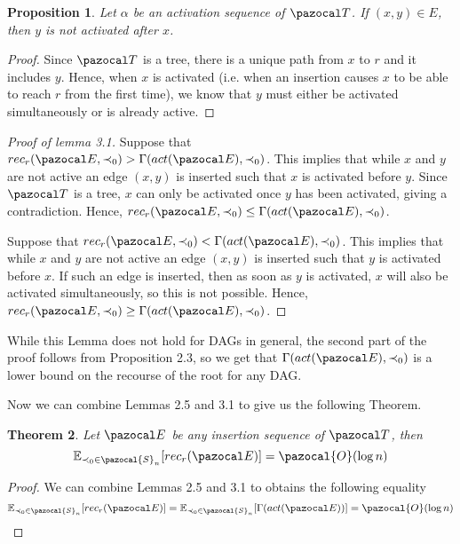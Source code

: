 \documentclass{article}
\newtheorem{theorem}{Theorem}[section]
\newtheorem{proposition}[theorem]{Proposition}
\begin{document}
\begin{proposition}
Let $\alpha$ be an activation sequence of $\pazocal T$. If $(x,y) \in E$, then $y$ is not activated after $x$.
\end{proposition}

\begin{proof}
Since $\pazocal T$ is a tree, there is a unique path from $x$ to $r$ and it includes $y$. Hence, when $x$ is activated (i.e. when an insertion causes $x$ to be able to reach $r$ from the first time), we know that $y$ must either be activated simultaneously or is already active.
\end{proof}

\begin{proof}[Proof of lemma 3.1]
Suppose that $rec_r(\pazocal E, \prec_0) > \Gamma(act(\pazocal E), \prec_0)$. This implies that while $x$ and $y$ are not active an edge $(x,y)$ is inserted such that $x$ is activated before $y$. Since $\pazocal T$ is a tree, $x$ can only be activated once $y$ has been activated, giving a contradiction. Hence, $rec_r(\pazocal E, \prec_0) \leq \Gamma(act(\pazocal E), \prec_0)$.

Suppose that $rec_r(\pazocal E, \prec_0) < \Gamma(act(\pazocal E), \prec_0)$. This implies that while $x$ and $y$ are not active an edge $(x,y)$ is inserted such that $y$ is activated before $x$. If such an edge is inserted, then as soon as $y$ is activated, $x$ will also be activated simultaneously, so this is not possible. Hence, $rec_r(\pazocal E, \prec_0) \geq \Gamma(act(\pazocal E), \prec_0)$.
\end{proof}

While this Lemma does not hold for DAGs in general, the second part of the proof follows from Proposition 2.3, so we get that $\Gamma(act(\pazocal E), \prec_0)$ is a lower bound on the recourse of the root for any DAG.

Now we can combine Lemmas 2.5 and 3.1 to give us the following Theorem.

\begin{theorem}
Let $\pazocal E$ be any insertion sequence of $\pazocal T$, then
\[ \mathbb{E}_{\prec_0 \in \pazocal{S}_n}[ rec_r(\pazocal E)] = \pazocal{O}(\log n) \]
\end{theorem}

\begin{proof}
We can combine Lemmas 2.5 and 3.1 to obtains the following equality
\[ \mathbb{E}_{\prec_0 \in \pazocal{S}_n}[ rec_r(\pazocal E)] = \mathbb{E}_{\prec_0 \in \pazocal{S}_n}[\Gamma(act(\pazocal E))] = \pazocal{O}(\log n) \]
\end{proof}
\end{document}
